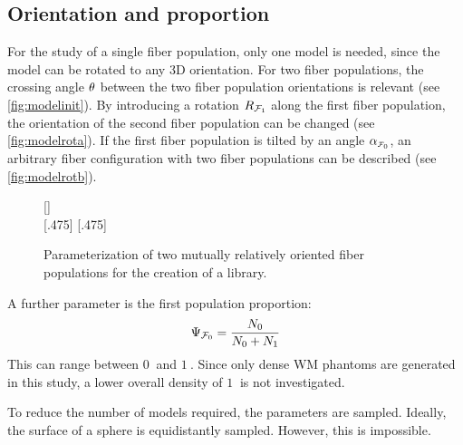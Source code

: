 \subsection{Orientation and proportion}\label{sec:modelParamet}
%
For the study of a single fiber population, only one model is needed, since the model can be rotated to any 3D orientation. 
For two fiber populations, the crossing angle $\textnormal{$\theta$}$ between the two fiber population orientations is relevant (see \cref{fig:modelinit}).
By introducing a rotation $\textnormal{$R_{\textnormal{$\mathcal{F}_1$}}$}$ along the first fiber population, the orientation of the second fiber population can be changed (see \cref{fig:modelrota}).
If the first fiber population is tilted by an angle $\modelInc$, an arbitrary fiber configuration with two fiber populations can be described (see \cref{fig:modelrotb}).
\par
% 
%
\begin{figure}[!t]
    \centering
    \setlength{\tikzwidth}{0.40\textwidth}
    [\textwidth]{}
    \\
    [.475\textwidth]{}\hfill
    [.475\textwidth]{}
    \caption{Parameterization of two mutually relatively oriented fiber populations for the creation of a library.}
    \label{fig:twomodelpopdesign}
    \end{figure}
% 
A further parameter is the first population proportion:
\begin{align}
    \textnormal{$\Psi_{\textnormal{$\mathcal{F}_0$}}$}=\frac{N_0}{N_0+N_1}
\end{align}
This can range between $\SI{0}{}$ and $\SI{1}{}$.
Since only dense \ac{WM} phantoms are generated in this study, a lower overall density of $\SI{1}{}$ is not investigated.
\par
%
To reduce the number of models required, the parameters are sampled.
Ideally, the surface of a sphere is equidistantly sampled.
However, this is impossible.
